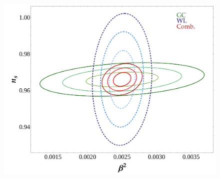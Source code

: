 \begin{figure}
\begin{centering}
\includegraphics[height=0.15\paperheight]{Chapters/fitting-funcs/figures/GC-WL-Comb-kNyHalf-margedCont-Grid3} 
\par\end{centering}


\end{figure}

